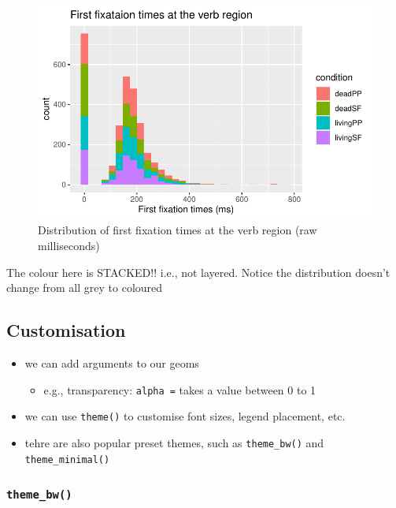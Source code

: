 \documentclass[
  letterpaper,
  DIV=11,
  numbers=noendperiod]{scrartcl}
\providecommand{\tightlist}{%
  \setlength{\itemsep}{0pt}\setlength{\parskip}{0pt}}\usepackage{longtable,booktabs,array}
\begin{document}
\begin{figure}[H]

{\centering \includegraphics{_data_viz_files/figure-pdf/unnamed-chunk-14-1.pdf}

}

\caption{Distribution of first fixation times at the verb region (raw
milliseconds)}

\end{figure}

The colour here is STACKED!! i.e., not layered. Notice the distribution
doesn't change from all grey to coloured

\hypertarget{customisation}{%
\subsection{Customisation}\label{customisation}}

\begin{itemize}
\tightlist
\item
  we can add arguments to our geoms

  \begin{itemize}
  \tightlist
  \item
    e.g., transparency: \texttt{alpha\ =} takes a value between 0 to 1
  \end{itemize}
\item
  we can use \texttt{theme()} to customise font sizes, legend placement,
  etc.
\item
  tehre are also popular preset themes, such as \texttt{theme\_bw()} and
  \texttt{theme\_minimal()}
\end{itemize}

\subsubsection{\texorpdfstring{\texttt{theme\_bw()}}{theme\_bw()}}
\end{document}
